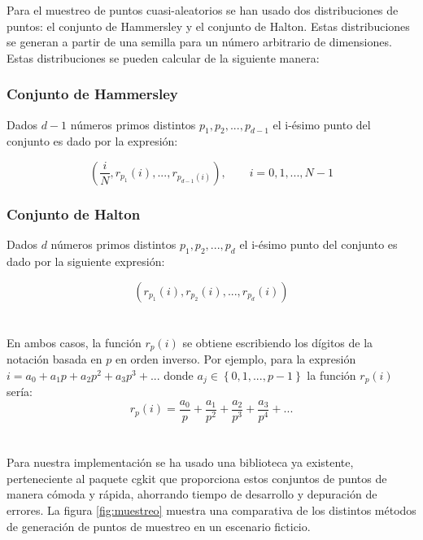 Para el muestreo de puntos cuasi-aleatorios se han usado dos distribuciones de puntos: el conjunto de Hammersley y el conjunto de Halton. Estas distribuciones se generan a partir de una semilla para un número arbitrario de dimensiones. Estas distribuciones se pueden calcular de la siguiente manera:

\subsubsection{Conjunto de Hammersley}

Dados $d-1$ números primos distintos $p_1, p_2, ... , p_{d-1}$ el i-ésimo punto del conjunto es dado por la expresión:

\[ \left( \frac{i}{N}, r_{p_1}(i), ..., r_{p_{d-1}(i)} \right), \qquad i = 0, 1, ..., N-1\]

\subsubsection{Conjunto de Halton}

Dados $d$ números primos distintos $p_1, p_2, ..., p_d$ el i-ésimo punto del conjunto es dado por la siguiente expresión:

\[ \left( r_{p_1}(i),  r_{p_2}(i), ...,  r_{p_d}(i) \right) \]\\~\\

En ambos casos, la función $r_p(i)$ se obtiene  escribiendo los dígitos de la notación basada en $p$ en orden inverso. Por ejemplo, para la expresión $i = a_0 + a_1 p + a_2 p^2 + a_3 p^3 + ... $ donde $a_j \in \left\lbrace 0, 1, ... , p-1 \right\rbrace$ la función $r_p(i)$ sería:\\

\[ r_p(i) = \frac{a_0}{p} + \frac{a_1}{p^2} + \frac{a_2}{p^3} + \frac{a_3}{p^4} + ...\]\\

\\

Para nuestra implementación se ha usado una biblioteca ya existente, perteneciente al paquete cgkit que proporciona estos conjuntos de puntos de manera cómoda y rápida, ahorrando tiempo de desarrollo y depuración de errores. La figura \ref{fig:muestreo} muestra una comparativa de los distintos métodos de generación de puntos de muestreo en un escenario ficticio.\\


